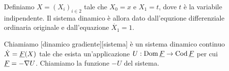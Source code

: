 \Proof Definiamo $X = (X_i)_{i \in 2}$ tale che $X_0 = x$ e $X_1 = t$, dove $t$ \`e la variabile indipendente. Il sistema dinamico \`e allora dato dall'equzione differenziale ordinaria originale e dall'equazione $\dot{X_1} = 1$. \EndProof
\begin{Definition}
	Chiamiamo [dinamico gradiente][sistema] \`e un sistema dinamico continuo $\dot{X} = \underline{F}(X)$ tale che esista un'applicazione $U: \operatorname{Dom}{\underline{F}} \rightarrow \operatorname{Cod}{\underline{F}}$ per cui $\underline{F} = - \nabla U$. Chiamiamo la funzione $-U$  del sistema.
\end{Definition}



